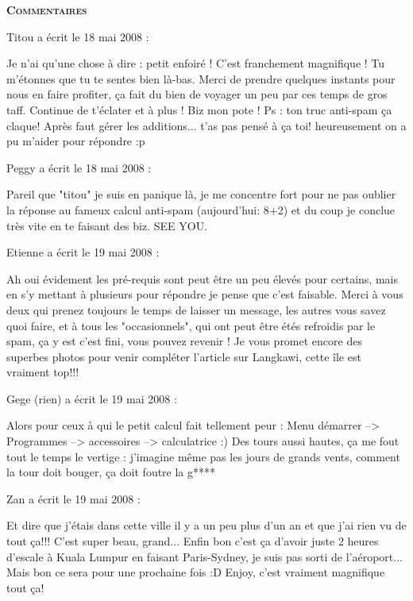 \bigskip
\textbf{\textsc{Commentaires}}

\medskip
Titou a écrit le 18 mai 2008 :
\begin{displayquote}
Je n'ai qu'une chose à dire : petit enfoiré ! C'est franchement magnifique ! Tu m'étonnes que tu te sentes bien là-bas. Merci de prendre quelques instants pour nous en faire profiter, ça fait du bien de voyager un peu par ces temps de gros taff. Continue de t'éclater et à plus ! Biz mon pote !
Ps : ton truc anti-spam ça claque! Après faut gérer les additions... t'as pas pensé à ça toi! heureusement on a pu m'aider pour répondre :p
\end{displayquote}

\medskip
Peggy a écrit le 18 mai 2008 :
\begin{displayquote}
Pareil que "titou" je suis en panique là, je me concentre fort pour ne pas oublier la réponse au fameux calcul anti-spam (aujourd'hui: 8+2) et du coup je conclue très vite en te faisant des biz.
SEE YOU.
\end{displayquote}

\medskip
Etienne a écrit le 19 mai 2008 :
\begin{displayquote}
Ah oui évidement les pré-requis sont peut être un peu élevés pour certains, mais en s'y mettant à plusieurs pour répondre je pense que c'est faisable.
Merci à vous deux qui prenez toujours le temps de laisser un message, les autres vous savez quoi faire, et à tous les "occasionnels", qui ont peut être étés refroidis par le spam, ça y est c'est fini, vous pouvez revenir !
Je vous promet encore des superbes photos pour venir compléter l'article sur Langkawi, cette île est vraiment top!!!
\end{displayquote}

\medskip
Gege (rien) a écrit le 19 mai 2008 :
\begin{displayquote}
Alors pour ceux à qui le petit calcul fait tellement peur : Menu démarrer --> Programmes --> accessoires --> calculatrice :)
Des tours aussi hautes, ça me fout tout le temps le vertige : j'imagine même pas les jours de grands vents, comment la tour doit bouger, ça doit foutre la g****
\end{displayquote}

\medskip
Zan a écrit le 19 mai 2008 :
\begin{displayquote}
Et dire que j'étais dans cette ville il y a un peu plus d'un an et que j'ai rien vu de tout ça!!! C'est super beau, grand...
Enfin bon c'est ça d'avoir juste 2 heures d'escale à Kuala Lumpur en faisant Paris-Sydney, je suis pas sorti de l'aéroport... Mais bon ce sera pour une prochaine fois :D
Enjoy, c'est vraiment magnifique tout ça!
\end{displayquote}

\vfill
